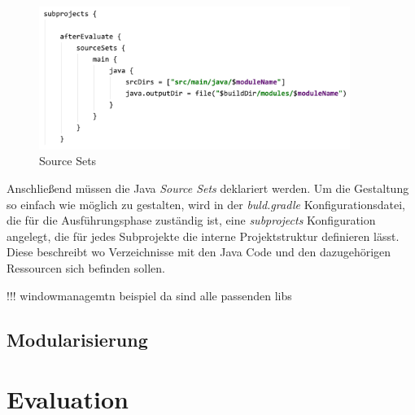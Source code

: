 	\begin{figure}[h!]
	  \centering
	  \includegraphics[width=0.9\textwidth]{material/images/gradle_sub_projects.png}
	  \caption{Source Sets}
	  \label{fig:Source_Sets}
	\end{figure}


 	Anschließend müssen die Java \textit{Source Sets} deklariert werden. Um die Gestaltung so einfach wie möglich zu gestalten, wird in der \textit{buld.gradle} Konfigurationsdatei, die für die Ausführungsphase zuständig ist, eine \textit{subprojects} Konfiguration angelegt, die für jedes Subprojekte die interne Projektstruktur definieren lässt. Diese beschreibt wo Verzeichnisse mit den Java Code und den dazugehörigen Ressourcen sich befinden sollen.  


 	!!! windowmanagemtn beispiel da sind alle passenden libs 




\subsection{Modularisierung} 		





\section{Evaluation}



